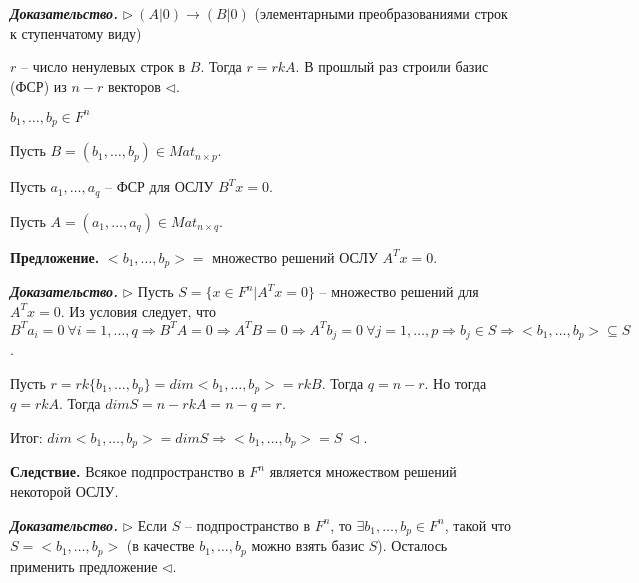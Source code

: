 \bigskip
\textbf{\textit{Доказательство.}} $\rhd \ (A|0) \rightarrow (B|0)$ (элементарными преобразованиями строк к ступенчатому виду)

\bigskip
$r$ -- число ненулевых строк в $B$. Тогда $r = rkA$. В прошлый раз строили базис (ФСР) из $n-r$ векторов $\lhd$.

\bigskip
$b_1, \dots, b_p \in F^n$

Пусть $B = (b_1, \dots, b_p) \in Mat_{n \times p}$.

Пусть $a_1, \dots, a_q$ -- ФСР для ОСЛУ $B^T x = 0$.

Пусть $A = (a_1, \dots, a_q) \in Mat_{n \times q}$.

\bigskip
\textbf{Предложение.} $<b_1, \dots, b_p> =$ множество решений ОСЛУ $A^T x = 0$.

\bigskip
\textbf{\textit{Доказательство.}} $\rhd$ Пусть $S = \{x \in F^n | A^Tx = 0\}$ -- множество решений для $A^Tx = 0$. Из условия следует, что $B^T a_i = 0 \ \forall i = 1, \dots, q \Rightarrow B^T A = 0 \Rightarrow A^T B = 0 \Rightarrow A^T b_j = 0 \ \forall j = 1, \dots, p \Rightarrow b_j \in S \Rightarrow <b_1, \dots, b_p> \subseteq S$.

Пусть $r = rk \{b_1, \dots, b_p\} = dim <b_1, \dots, b_p> = rkB$. Тогда $q = n - r$. Но тогда $q = rkA$. Тогда $dimS = n - rkA = n - q = r$.

Итог: $dim<b_1, \dots, b_p> = dim S \Rightarrow <b_1, \dots, b_p> = S \ \lhd$.

\bigskip
\textbf{Следствие.} Всякое подпространство в $F^n$ является множеством решений некоторой ОСЛУ.

\bigskip
\textbf{\textit{Доказательство.}} $\rhd$ Если $S$ -- подпространство в $F^n$, то $\exists b_1, \dots, b_p \in F^n$, такой что $S = <b_1, \dots, b_p>$ (в качестве $b_1, \dots, b_p$ можно взять базис $S$). Осталось применить предложение $\lhd$.

